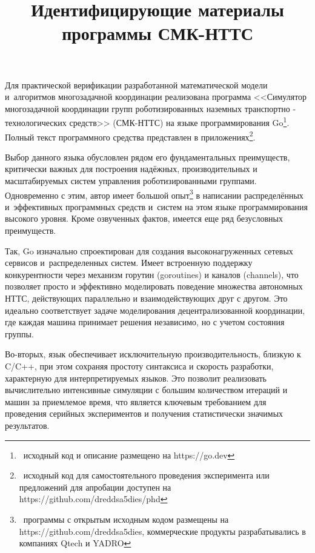 

\title{Идентифицирующие материалы программы СМК-НТТС}



    \maketitle

Для практической верификации разработанной математической модели и~алгоритмов многозадачной координации реализована программа <<Симулятор многозадачной координации групп роботизированных наземных транспортно - технологических средств>> (СМК-НТТС) на языке программирования Go\footnote{\  исходный код и описание размещено на https://go.dev}. Полный текст программного средства представлен в приложениях\footnote{\  исходный код для самостоятельного проведения эксперимента или предложений для апробации доступен на https://github.com/dreddsa5dies/phd}.

Выбор данного языка обусловлен рядом его фундаментальных преимуществ, критически важных для построения надёжных, производительных и масштабируемых систем управления роботизированными группами. Одновременно с этим, автор имеет большой опыт\footnote{\  программы с открытым исходным кодом размещены на https://github.com/dreddsa5dies, коммерческие продукты разрабатывались в компаниях Qtech и YADRO} в написании распределённых и~эффективных программных средств и~систем на этом языке программирования высокого уровня. Кроме озвученных фактов, имеется еще ряд безусловных преимуществ.

Так, Go изначально спроектирован для создания высоконагруженных сетевых сервисов и~распределенных систем. Имеет встроенную поддержку конкурентности через механизм горутин (goroutines) и каналов (channels), что позволяет просто и эффективно моделировать поведение множества автономных НТТС, действующих параллельно и взаимодействующих друг с другом. Это идеально соответствует задаче моделирования децентрализованной координации, где каждая машина принимает решения независимо, но с учетом состояния группы.

Во-вторых, язык обеспечивает исключительную производительность, близкую к C/C++, при этом сохраняя простоту синтаксиса и скорость разработки, характерную для интерпретируемых языков. Это позволит реализовать вычислительно интенсивные симуляции с большим количеством итераций и машин за приемлемое время, что является ключевым требованием для проведения серийных экспериментов и получения статистически значимых результатов.

